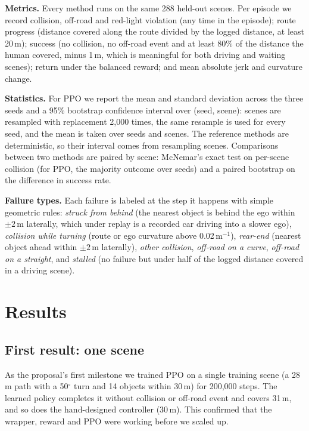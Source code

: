\documentclass[conference]{IEEEtran}
\begin{document}
\textbf{Metrics.} Every method runs on the same 288 held-out scenes. Per episode we record
collision, off-road and red-light violation (any time in the episode); route progress
(distance covered along the route divided by the logged distance, at least 20\,m);
success (no collision, no off-road event and at least 80\% of the distance the human
covered, minus 1\,m, which is meaningful for both driving and waiting scenes); return
under the balanced reward; and mean absolute jerk and curvature change.

\textbf{Statistics.} For PPO we report the mean and standard deviation across the three
seeds and a 95\% bootstrap confidence interval over (seed, scene): scenes are resampled
with replacement 2,000 times, the same resample is used for every seed, and the mean is
taken over seeds and scenes. The reference methods are deterministic, so their interval
comes from resampling scenes. Comparisons between two methods are paired by scene:
McNemar's exact test on per-scene collision (for PPO, the majority outcome over seeds)
and a paired bootstrap on the difference in success rate.

\textbf{Failure types.} Each failure is labeled at the step it happens with simple
geometric rules: \emph{struck from behind} (the nearest object is behind the ego within $\pm 2$\,m laterally, which
under replay is a recorded car driving into a slower ego), \emph{collision while
turning} (route or ego curvature above 0.02\,m$^{-1}$), \emph{rear-end} (nearest object
ahead within $\pm 2$\,m laterally), \emph{other collision}, \emph{off-road on a curve},
\emph{off-road on a straight}, and \emph{stalled} (no failure but under half of the
logged distance covered in a driving scene).

\section{Results}

\subsection{First result: one scene}
As the proposal's first milestone we trained PPO on a single training scene (a 28\,m
path with a 50$^\circ$ turn and 14 objects within 30\,m) for 200,000 steps. The learned
policy completes it without collision or off-road event and covers 31\,m, and so does
the hand-designed controller (30\,m). This confirmed that the wrapper, reward and PPO
were working before we scaled up.
\end{document}
